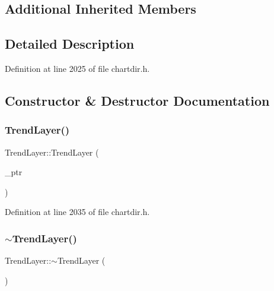 \subsection*{Additional Inherited Members}


\subsection{Detailed Description}


Definition at line 2025 of file chartdir.\+h.



\subsection{Constructor \& Destructor Documentation}
\mbox{\label{class_trend_layer_a2114c97aaf3fdf29a5dd62676563d456}} 
\subsubsection{\texorpdfstring{Trend\+Layer()}{TrendLayer()}}
{\footnotesize\ttfamily Trend\+Layer\+::\+Trend\+Layer (\begin{DoxyParamCaption}\item[{Trend\+Layer\+Internal $\ast$}]{\+\_\+ptr }\end{DoxyParamCaption})\hspace{0.3cm}{\ttfamily [inline]}}



Definition at line 2035 of file chartdir.\+h.

\mbox{\label{class_trend_layer_a046cc9cb64ea314e189fe679b68a0168}} 
\subsubsection{\texorpdfstring{$\sim$\+Trend\+Layer()}{~TrendLayer()}}
{\footnotesize\ttfamily Trend\+Layer\+::$\sim$\+Trend\+Layer (\begin{DoxyParamCaption}{ }\end{DoxyParamCaption})\hspace{0.3cm}{\ttfamily [inline]}}



